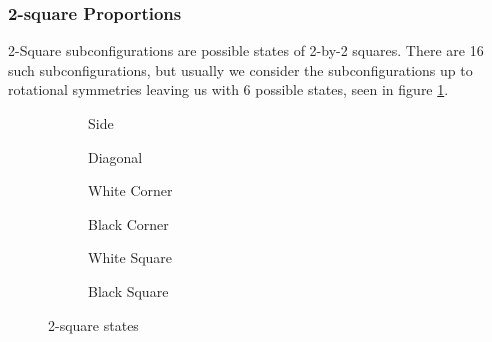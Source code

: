 \documentclass[12pt]{article}
\theoremstyle{definition}
\theoremstyle{remark}
\theoremstyle{remark}
\begin{document}
\subsubsection{2-square Proportions} \label{2squareFirst}
\par
2-Square subconfigurations are possible states of 2-by-2 squares. There are 16 such subconfigurations, but usually we consider the subconfigurations up to rotational symmetries leaving us with 6 possible states, seen in figure \ref{2Shapes}.

\begin{figure}
  \centering
  \begin{subfigure}[b]{0.3\linewidth}
    \caption{Side}
  \end{subfigure}
  \begin{subfigure}[b]{0.3\linewidth}
    \caption{Diagonal}
  \end{subfigure}
  \begin{subfigure}[b]{0.3\linewidth}
    \caption{White Corner}
  \end{subfigure}
  \begin{subfigure}[b]{0.3\linewidth}
    \caption{Black Corner}
  \end{subfigure}
  \begin{subfigure}[b]{0.3\linewidth}
    \caption{White Square}
  \end{subfigure}
  \begin{subfigure}[b]{0.3\linewidth}
    \caption{Black Square}
  \end{subfigure}
  \caption{2-square states}
  \label{2Shapes}
\end{figure}
\end{document}
